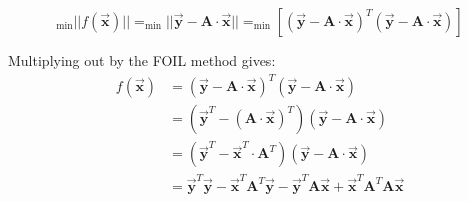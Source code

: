 \documentclass[a4paper,10pt]{article}
\newcommand{\cA}{\ensuremath{\mathbf{A}}}
\newcommand{\cx}{\ensuremath{\vec{\mathbf{x}}}}
\newcommand{\cy}{\ensuremath{\vec{\mathbf{y}}}}
\newcommand{\vLength}[1]{\ensuremath{\lvert\lvert{#1}\lvert\lvert}}
\begin{document}
\begin{equation}
_{\min}\vLength{f\left(\cx\right)}=_{\min}\vLength{\cy - \cA\cdot\cx}=_{\min}\left[\left(\cy - \cA\cdot\cx\right)^{T}\left(\cy - \cA\cdot\cx\right)\right]
\end{equation}

Multiplying out by the FOIL method gives:\\ 
\begin{equation}
\begin{split}
f\left(\cx\right)&=\left(\cy - \cA\cdot\cx\right)^{T}\left(\cy - \cA\cdot\cx\right)\\
&=\left(\cy^{T} - \left(\cA\cdot\cx\right)^{T}\right)\left(\cy - \cA\cdot\cx\right)\\
&=\left(\cy^{T} - \cx^{T}\cdot\cA^{T}\right)\left(\cy - \cA\cdot\cx\right)\\
&=\cy^{T}\cy - \cx^{T}\cA^{T}\cy - \cy^{T}\cA\cx+\cx^{T}\cA^{T}\cA\cx\\
\end{split}
\end{equation}
\end{document}
